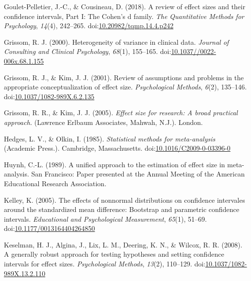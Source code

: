 \documentclass[
  man,floatsintext]{apa6}
\begin{document}
\leavevmode\hypertarget{ref-Pelletier_Cousineau_2018}{}%
Goulet-Pelletier, J.-C., \& Cousineau, D. (2018). A review of effect sizes and their confidence intervals, Part I: The Cohen's d family. \emph{The Quantitative Methods for Psychology}, \emph{14}(4), 242--265. doi:\href{https://doi.org/10.20982/tqmp.14.4.p242}{10.20982/tqmp.14.4.p242}

\leavevmode\hypertarget{ref-Grissom_2000}{}%
Grissom, R. J. (2000). Heterogeneity of variance in clinical data. \emph{Journal of Consulting and Clinical Psychology}, \emph{68}(1), 155--165. doi:\href{https://doi.org/10.1037//0022-006x.68.1.155}{10.1037//0022-006x.68.1.155}

\leavevmode\hypertarget{ref-Grissom_Kim_2001}{}%
Grissom, R. J., \& Kim, J. J. (2001). Review of assumptions and problems in the appropriate conceptualization of effect size. \emph{Psychological Methods}, \emph{6}(2), 135--146. doi:\href{https://doi.org/10.1037/1082-989X.6.2.135}{10.1037/1082-989X.6.2.135}

\leavevmode\hypertarget{ref-Grissom_and_kim_2005}{}%
Grissom, R. R., \& Kim, J. J. (2005). \emph{Effect size for research: A broad practical approach.} (Lawrence Erlbaum Associates, Mahwah, N.J.). London.

\leavevmode\hypertarget{ref-Hedges_Olkin_1985}{}%
Hedges, L. V., \& Olkin, I. (1985). \emph{Statistical methods for meta-analysis} (Academic Press.). Cambridge, Massachusetts. doi:\href{https://doi.org/10.1016/C2009-0-03396-0}{10.1016/C2009-0-03396-0}

\leavevmode\hypertarget{ref-Huynh_1989}{}%
Huynh, C.-L. (1989). A unified approach to the estimation of effect size in meta-analysis. San Francisco: Paper presented at the Annual Meeting of the American Educational Research Association.

\leavevmode\hypertarget{ref-Kelley_2005}{}%
Kelley, K. (2005). The effects of nonnormal distributions on confidence intervales around the standardized mean difference: Bootstrap and parametric confidence intervals. \emph{Educational and Psychological Measurement}, \emph{65}(1), 51--69. doi:\href{https://doi.org/10.1177/0013164404264850}{10.1177/0013164404264850}

\leavevmode\hypertarget{ref-Keselman_et_al_2008}{}%
Keselman, H. J., Algina, J., Lix, L. M., Deering, K. N., \& Wilcox, R. R. (2008). A generally robust approach for testing hypotheses and setting confidence intervals for effect sizes. \emph{Psychological Methods}, \emph{13}(2), 110--129. doi:\href{https://doi.org/10.1037/1082-989X.13.2.110}{10.1037/1082-989X.13.2.110}
\end{document}

